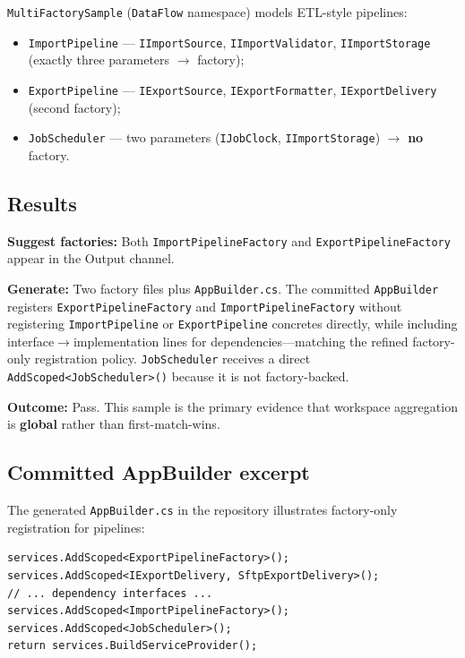 \texttt{MultiFactorySample} (\texttt{DataFlow} namespace) models ETL-style pipelines:
\begin{itemize}
	\item \texttt{ImportPipeline} --- \texttt{IImportSource}, \texttt{IImportValidator}, \texttt{IImportStorage} (exactly three parameters $\rightarrow$ factory);
	\item \texttt{ExportPipeline} --- \texttt{IExportSource}, \texttt{IExportFormatter}, \texttt{IExportDelivery} (second factory);
	\item \texttt{JobScheduler} --- two parameters (\texttt{IJobClock}, \texttt{IImportStorage}) $\rightarrow$ \textbf{no} factory.
\end{itemize}

\subsection{Results}

\textbf{Suggest factories:} Both \texttt{ImportPipelineFactory} and \texttt{ExportPipelineFactory} appear in the Output channel.

\textbf{Generate:} Two factory files plus \texttt{AppBuilder.cs}. The committed \texttt{AppBuilder} registers \texttt{ExportPipelineFactory} and \texttt{ImportPipelineFactory} without registering \texttt{ImportPipeline} or \texttt{ExportPipeline} concretes directly, while including interface$\rightarrow$implementation lines for dependencies---matching the refined factory-only registration policy. \texttt{JobScheduler} receives a direct \texttt{AddScoped<JobScheduler>()} because it is not factory-backed.

\textbf{Outcome:} Pass. This sample is the primary evidence that workspace aggregation is \textbf{global} rather than first-match-wins.

\subsection{Committed AppBuilder excerpt}

The generated \texttt{AppBuilder.cs} in the repository illustrates factory-only registration for pipelines:

\begin{lstlisting}[caption={MultiFactorySample GeneratedDI/AppBuilder.cs (excerpt)}]
services.AddScoped<ExportPipelineFactory>();
services.AddScoped<IExportDelivery, SftpExportDelivery>();
// ... dependency interfaces ...
services.AddScoped<ImportPipelineFactory>();
services.AddScoped<JobScheduler>();
return services.BuildServiceProvider();
\end{lstlisting}

